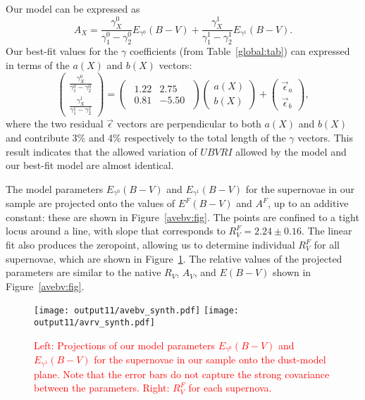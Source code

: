 \documentclass{aastex61}   	%
\begin{document}
Our model can be expressed as
\begin{equation}
A_X = \frac{\gamma^0_X}{\gamma^0_1-\gamma^0_2}  E_{\gamma^0}(B-V) +  \frac{\gamma^1_X}{\gamma^1_1-\gamma^1_2}  E_{\gamma^1}(B-V).
\end{equation}
Our best-fit values for the $\gamma$ coefficients (from Table~\ref{global:tab}) can expressed in terms of the $a(X)$ and $b(X)$ vectors:
\begin{equation}
\begin{pmatrix}
 \frac{\gamma^0_X}{\gamma^0_1-\gamma^0_2} \\
\frac{\gamma^1_X}{\gamma^1_1-\gamma^1_2} 
\end{pmatrix}=
\begin{pmatrix}
\begin{array}{rr}
1.22 & 2.75 \\
0.81 & -5.50
\end{array}
\end{pmatrix} 
\begin{pmatrix}
a(X) \\
b(X)
\end{pmatrix}+
\begin{pmatrix}
\vec{\epsilon}_a \\
\vec{\epsilon}_b
\end{pmatrix},
\end{equation}
where the two residual $\vec{\epsilon}$ vectors are perpendicular to both $a(X)$ and $b(X)$ and
contribute  3\% and 4\% respectively to the total  length of the $\gamma$ vectors.
This result indicates that
the allowed variation of $UBVRI$ allowed by the  model and our best-fit model are almost identical.

The model parameters $E_{\gamma^0}(B-V)$ and  $E_{\gamma^1}(B-V)$ for the supernovae in our sample
are projected onto the   values of $E^F(B-V)$ and $A^F$, up to an additive constant:  these are shown in Figure~\ref{avebv:fig}.
The points are confined to a tight locus around a line, with slope that corresponds to $R^F_V=2.24 \pm 0.16$.  
The linear fit also produces the zeropoint, allowing us to determine individual $R^F_V$ for all supernovae,
which are shown in Figure~\ref{avebv_synth:fig}.   The relative values of the projected parameters are similar to
the native $R_V$, $A_V$, and $E(B-V)$  shown in Figure~\ref{avebv:fig}.

\begin{figure}[htbp] %
   \centering
   \texttt{[image: output11/avebv\_synth.pdf]}
   \texttt{[image: output11/avrv\_synth.pdf]}
    \caption{\textcolor{red}{Left: Projections of our model parameters $E_{\gamma^0}(B-V)$ and  $E_{\gamma^1}(B-V)$ for the supernovae in our sample
onto the   dust-model plane.  Note that the error bars do not capture the strong
covariance between the parameters. Right: $R^F_V$ for each supernova.}
   \label{avebv_synth:fig}}
\end{figure}
\end{document}
